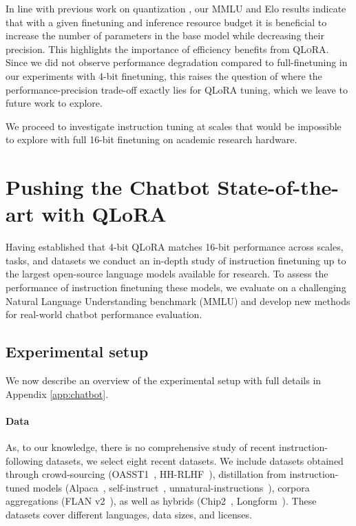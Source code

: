 In line with previous work on quantization \citep{dettmers2022case}, our MMLU and Elo results indicate that with a given finetuning and inference resource budget it is beneficial to increase the number of parameters in the base model while decreasing their precision. This highlights the importance of efficiency benefits from \textsc{QLoRA}. Since we did not observe performance degradation compared to full-finetuning in our experiments with 4-bit finetuning, this raises the question of where the performance-precision trade-off exactly lies for QLoRA tuning, which we leave to future work to explore.

We proceed to investigate instruction tuning at scales that would be impossible to explore with full 16-bit finetuning on academic research hardware.

\section{Pushing the Chatbot State-of-the-art with QLoRA}
\label{sec:pushing}
Having established that 4-bit \textsc{QLoRA} matches 16-bit performance across scales, tasks, and datasets we conduct an in-depth study of instruction finetuning up to the largest open-source language models available for research. To assess the performance of instruction finetuning these models, we evaluate on a challenging Natural Language Understanding benchmark (MMLU) and develop new methods for real-world  chatbot performance evaluation. 

\subsection{Experimental setup} We now describe an overview of the experimental setup with full details in Appendix \ref{app:chatbot}. 

\paragraph{Data} As, to our knowledge, there is no comprehensive study of recent instruction-following datasets, we select eight recent datasets. We include datasets obtained through crowd-sourcing (OASST1~\citep{kopf2023openassistant}, HH-RLHF~\citep{bai2022training}), distillation from instruction-tuned models (Alpaca~\citep{alpaca}, self-instruct~\citep{wang2022self}, unnatural-instructions~\citep{honovich2022unnatural}), corpora aggregations (FLAN v2~\citep{chung2022scaling}), as well as hybrids (Chip2~\citep{laion2023}, Longform~\citep{koksal2023longform}). These datasets cover different languages, data sizes, and licenses. 

